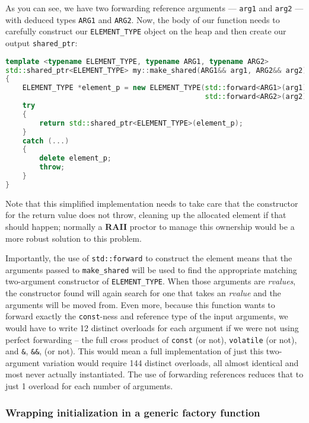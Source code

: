 \noindent As you can see, we have two forwarding reference arguments ---
\texttt{arg1} and \texttt{arg2} --- with deduced types \texttt{ARG1} and
\texttt{ARG2}. Now, the body of our function needs to carefully
construct our \texttt{ELEMENT\_TYPE} object on the heap and then create
our output \texttt{shared\_ptr}:

\begin{lstlisting}[language=C++]
template <typename ELEMENT_TYPE, typename ARG1, typename ARG2>
std::shared_ptr<ELEMENT_TYPE> my::make_shared(ARG1&& arg1, ARG2&& arg2)
{
    ELEMENT_TYPE *element_p = new ELEMENT_TYPE(std::forward<ARG1>(arg1),
                                               std::forward<ARG2>(arg2));
    try
    {
        return std::shared_ptr<ELEMENT_TYPE>(element_p);
    }
    catch (...)
    {
        delete element_p;
        throw;
    }
}
\end{lstlisting}

\noindent Note that this simplified implementation needs to take care that the
constructor for the return value does not throw, cleaning up the
allocated element if that should happen; normally a \textbf{RAII}
proctor to manage this ownership would be a more robust solution to this
problem.

Importantly, the use of \texttt{std::forward} to construct the element
means that the arguments passed to \texttt{make\_shared} will be used to
find the appropriate matching two-argument constructor of
\texttt{ELEMENT\_TYPE}. When those arguments are \emph{rvalues}, the
constructor found will again search for one that takes an \emph{rvalue}
and the arguments will be moved from. Even more, because this function
wants to forward exactly the \texttt{const}-ness and reference type of
the input arguments, we would have to write 12 distinct overloads for
each argument if we were not using perfect forwarding -- the full cross
product of \texttt{const} (or not), \texttt{volatile} (or not), and
\texttt{\&}, \texttt{\&\&}, (or not). This would mean a full
implementation of just this two-argument variation would require 144
distinct overloads, all almost identical and most never actually
instantiated. The use of forwarding references reduces that to just 1
overload for each number of arguments.

\subsubsection[Wrapping initialization in a generic factory function]{Wrapping initialization in a generic factory function}\label{wrapping-initialization-in-a-generic-factory-function}

